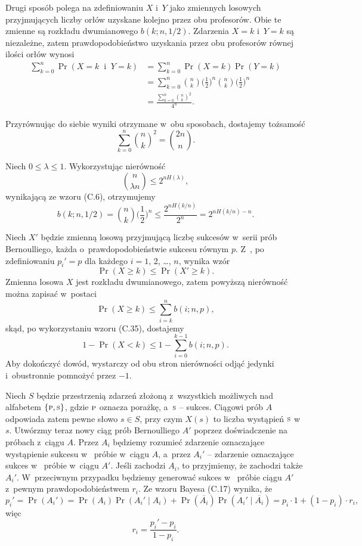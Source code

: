 Drugi sposób polega na zdefiniowaniu $X$ i~$Y$ jako zmiennych losowych przyjmujących liczby orłów uzyskane kolejno przez obu profesorów.
Obie te zmienne są rozkładu dwumianowego $b(k;n,1/2)$.
Zdarzenia $X=k$ i~$Y=k$ są niezależne, zatem prawdopodobieństwo uzyskania przez obu profesorów równej ilości orłów wynosi
\begin{align*}
	\sum_{k=0}^n\Pr(X=k\;\;\text{i}\;\;Y=k) &= \sum_{k=0}^n\Pr(X=k)\Pr(Y=k) \\
	&= \sum_{k=0}^n\binom{n}{k}\biggl(\frac{1}{2}\biggr)^n\binom{n}{k}\biggl(\frac{1}{2}\biggr)^n \\
	&= \frac{\sum_{k=0}^n\binom{n}{k}^2}{4^n}.
\end{align*}

Przyrównując do siebie wyniki otrzymane w~obu sposobach, dostajemy tożsamość
\[
	\sum_{k=0}^n\binom{n}{k}^2 = \binom{2n}{n}.
\]

\exercise %
Niech $0\le\lambda\le1$.
Wykorzystując nierówność
\[
	\binom{n}{\lambda n} \le 2^{nH(\lambda)},
\]
wynikającą ze wzoru (C.6), otrzymujemy
\[
	b(k;n,1/2) = \binom{n}{k}\biggl(\frac{1}{2}\biggr)^n \le \frac{2^{nH(k/n)}}{2^n} = 2^{nH(k/n)-n}.
\]

\exercise %

\noindent Niech $X'$ będzie zmienną losową przyjmującą liczbę sukcesów w~serii prób Bernoulliego, każda o~prawdopodobieństwie sukcesu równym $p$.
Z~, po zdefiniowaniu $p_i'=p$ dla każdego $i=1$, 2, \dots, $n$, wynika wzór
\[
    \Pr(X\ge k) \le \Pr(X'\ge k).
\]
Zmienna losowa $X$ jest rozkładu dwumianowego, zatem powyższą nierówność można zapisać w~postaci
\[
    \Pr(X\ge k) \le \sum_{i=k}^nb(i;n,p),
\]
skąd, po wykorzystaniu wzoru (C.35), dostajemy
\[
    1-\Pr(X<k) \le 1-\sum_{i=0}^{k-1}b(i;n,p).
\]
Aby dokończyć dowód, wystarczy od obu stron nierówności odjąć jedynki i~obustronnie pomnożyć przez $-1$.

\exercise %
Niech $S$ będzie przestrzenią zdarzeń złożoną z~wszystkich możliwych  nad alfabetem $\{{\scriptstyle\rm P},{\scriptstyle\rm S}\}$, gdzie ${\scriptstyle\rm P}$ oznacza porażkę, a~${\scriptstyle\rm S}$ -- sukces.
Ciągowi prób $A$ odpowiada zatem pewne słowo $s\in S$, przy czym $X(s)$ to liczba wystąpień ${\scriptstyle\rm S}$ w~$s$.
Utwórzmy teraz nowy ciąg prób Bernoulliego $A'$ poprzez doświadczenie na próbach z~ciągu $A$.
Przez $A_i$ będziemy rozumieć zdarzenie oznaczające wystąpienie sukcesu w~ próbie w~ciągu $A$, a~przez $A_i'$ -- zdarzenie oznaczające sukces w~ próbie w~ciągu $A'$.
Jeśli zachodzi $A_i$, to przyjmiemy, że zachodzi także $A_i'$.
W~przeciwnym przypadku będziemy generować sukces w~ próbie ciągu $A'$ z~pewnym prawdopodobieństwem $r_i$.
Ze wzoru Bayesa (C.17) wynika, że
\[
    p_i' = \Pr(A_i') = \Pr(A_i)\Pr(A_i'\mid A_i)+\Pr(\overline{A_i})\Pr(A_i'\mid\overline{A_i}) = p_i\cdot1+(1-p_i)\cdot r_i,
\]
więc
\[
    r_i = \frac{p_i'-p_i}{1-p_i}.
\]

